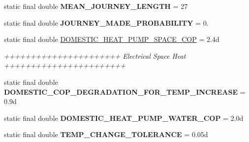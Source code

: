 \begin{DoxyCompactItemize}
\item 
\hypertarget{classuk_1_1ac_1_1dmu_1_1iesd_1_1cascade_1_1base_1_1_consts_accad59ab1524e576f71611cf441f22e6}{static final double {\bfseries M\-E\-A\-N\-\_\-\-J\-O\-U\-R\-N\-E\-Y\-\_\-\-L\-E\-N\-G\-T\-H} = 27}\label{classuk_1_1ac_1_1dmu_1_1iesd_1_1cascade_1_1base_1_1_consts_accad59ab1524e576f71611cf441f22e6}

\item 
\hypertarget{classuk_1_1ac_1_1dmu_1_1iesd_1_1cascade_1_1base_1_1_consts_acbe4f7ac3217c1d5bfc10b976f604e53}{static final double {\bfseries J\-O\-U\-R\-N\-E\-Y\-\_\-\-M\-A\-D\-E\-\_\-\-P\-R\-O\-B\-A\-B\-I\-L\-I\-T\-Y} = 0.}\label{classuk_1_1ac_1_1dmu_1_1iesd_1_1cascade_1_1base_1_1_consts_acbe4f7ac3217c1d5bfc10b976f604e53}

\item 
\hypertarget{classuk_1_1ac_1_1dmu_1_1iesd_1_1cascade_1_1base_1_1_consts_af887eecc9b6a8f46b6fa3d6c62a65231}{static final double \hyperlink{classuk_1_1ac_1_1dmu_1_1iesd_1_1cascade_1_1base_1_1_consts_af887eecc9b6a8f46b6fa3d6c62a65231}{D\-O\-M\-E\-S\-T\-I\-C\-\_\-\-H\-E\-A\-T\-\_\-\-P\-U\-M\-P\-\_\-\-S\-P\-A\-C\-E\-\_\-\-C\-O\-P} = 2.\-4d}\label{classuk_1_1ac_1_1dmu_1_1iesd_1_1cascade_1_1base_1_1_consts_af887eecc9b6a8f46b6fa3d6c62a65231}

\begin{DoxyCompactList}\small\item\em ++++++++++++++++++++++ Electrical Space Heat +++++++++++++++++++++++ \end{DoxyCompactList}\item 
\hypertarget{classuk_1_1ac_1_1dmu_1_1iesd_1_1cascade_1_1base_1_1_consts_a23d3ec480c10d29d4e2c2f8049e6d53f}{static final double {\bfseries D\-O\-M\-E\-S\-T\-I\-C\-\_\-\-C\-O\-P\-\_\-\-D\-E\-G\-R\-A\-D\-A\-T\-I\-O\-N\-\_\-\-F\-O\-R\-\_\-\-T\-E\-M\-P\-\_\-\-I\-N\-C\-R\-E\-A\-S\-E} = 0.\-9d}\label{classuk_1_1ac_1_1dmu_1_1iesd_1_1cascade_1_1base_1_1_consts_a23d3ec480c10d29d4e2c2f8049e6d53f}

\item 
\hypertarget{classuk_1_1ac_1_1dmu_1_1iesd_1_1cascade_1_1base_1_1_consts_a497d14a6fb3d439f1a41c54585248d02}{static final double {\bfseries D\-O\-M\-E\-S\-T\-I\-C\-\_\-\-H\-E\-A\-T\-\_\-\-P\-U\-M\-P\-\_\-\-W\-A\-T\-E\-R\-\_\-\-C\-O\-P} = 2.\-0d}\label{classuk_1_1ac_1_1dmu_1_1iesd_1_1cascade_1_1base_1_1_consts_a497d14a6fb3d439f1a41c54585248d02}

\item 
\hypertarget{classuk_1_1ac_1_1dmu_1_1iesd_1_1cascade_1_1base_1_1_consts_a6b37f68bfab8a4f68c820336c62aaa69}{static final double {\bfseries T\-E\-M\-P\-\_\-\-C\-H\-A\-N\-G\-E\-\_\-\-T\-O\-L\-E\-R\-A\-N\-C\-E} = 0.\-05d}\label{classuk_1_1ac_1_1dmu_1_1iesd_1_1cascade_1_1base_1_1_consts_a6b37f68bfab8a4f68c820336c62aaa69}


\end{DoxyCompactItemize}

